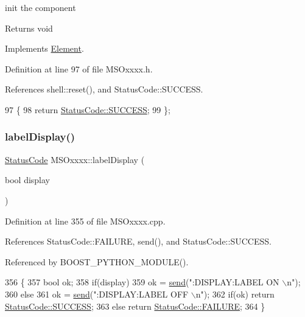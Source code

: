 init the component

\begin{DoxyReturn}{Returns}
void 
\end{DoxyReturn}


Implements \hyperlink{classElement_af42754b5cabc198869222725218d695c}{Element}.



Definition at line 97 of file M\+S\+Oxxxx.\+h.



References shell\+::reset(), and Status\+Code\+::\+S\+U\+C\+C\+E\+SS.


\begin{DoxyCode}
97                     \{
98     \textcolor{keywordflow}{return} \hyperlink{classStatusCode_a6f565cbeadc76d14c72f047e5e85eb4badd0da38d3ba0d922efd1f4619bc37ad8}{StatusCode::SUCCESS};
99   \};
\end{DoxyCode}
\mbox{\label{classMSOxxxx_ade4192f09f150be8b9c7c081ce1a1870}} 
\subsubsection{\texorpdfstring{label\+Display()}{labelDisplay()}}
{\footnotesize\ttfamily \hyperlink{classStatusCode}{Status\+Code} M\+S\+Oxxxx\+::label\+Display (\begin{DoxyParamCaption}\item[{bool}]{display }\end{DoxyParamCaption})}



Definition at line 355 of file M\+S\+Oxxxx.\+cpp.



References Status\+Code\+::\+F\+A\+I\+L\+U\+RE, send(), and Status\+Code\+::\+S\+U\+C\+C\+E\+SS.



Referenced by B\+O\+O\+S\+T\+\_\+\+P\+Y\+T\+H\+O\+N\+\_\+\+M\+O\+D\+U\+L\+E().


\begin{DoxyCode}
356 \{
357     \textcolor{keywordtype}{bool} ok;
358     \textcolor{keywordflow}{if}(display)     
359         ok = \hyperlink{classMSOxxxx_ae77668a1ae4ccb74e0ed5f2485dfdebf}{send}(\textcolor{stringliteral}{":DISPLAY:LABEL ON \(\backslash\)n"});
360     \textcolor{keywordflow}{else}
361         ok = \hyperlink{classMSOxxxx_ae77668a1ae4ccb74e0ed5f2485dfdebf}{send}(\textcolor{stringliteral}{":DISPLAY:LABEL OFF \(\backslash\)n"});
362     \textcolor{keywordflow}{if}(ok)  \textcolor{keywordflow}{return} \hyperlink{classStatusCode_a6f565cbeadc76d14c72f047e5e85eb4badd0da38d3ba0d922efd1f4619bc37ad8}{StatusCode::SUCCESS};
363     \textcolor{keywordflow}{else}        \textcolor{keywordflow}{return} \hyperlink{classStatusCode_a6f565cbeadc76d14c72f047e5e85eb4ba3da73d4c469762eb9d3c960368252b26}{StatusCode::FAILURE};  
364 \}
\end{DoxyCode}
\mbox{\label{classMSOxxxx_a4acff38c6f55795533c4d6b4cef6106b}} 
